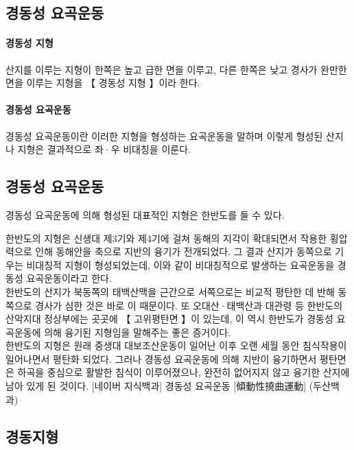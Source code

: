 \documentclass[12pt,a4paper]{book}
\begin{document}
	\subsection{경동성 요곡운동}

\paragraph{경동성 지형}
산지를 이루는 지형이 한쪽은 높고 급한 면을 이루고, 다른 한쪽은 낮고 경사가 완만한 면을 이루는 지형을 【 경동성 지형 】이라 한다. 


\paragraph{경동성 요곡운동}
경동성 요곡운동이란 이러한 지형을 형성하는 요곡운동을 말하며 이렇게 형성된 산지나 지형은 결과적으로 좌·우 비대칭을 이룬다.



	\subsection{경동성 요곡운동}


경동성 요곡운동에 의해 형성된 대표적인 지형은 한반도를 들 수 있다. 

한반도의 지형은 신생대 제3기와 제4기에 걸쳐 동해의 지각이 확대되면서 작용한 횡압력으로 인해 동해안을 축으로 지반의 융기가 전개되었다. 그 결과 산지가 동쪽으로 기우는 비대칭적 지형이 형성되었는데, 이와 같이 비대칭적으로 발생하는 요곡운동을 경동성 요곡운동이라고 한다.
\\[-1.0em]

한반도의 산지가 북동쪽의 태백산맥을 근간으로 서쪽으로는 비교적 평탄한 데 반해 동쪽으로 경사가 심한 것은 바로 이 때문이다. 또 오대산·태백산과 대관령 등 한반도의 산악지대 정상부에는 곳곳에 【 고위평탄면 】이 있는데, 이 역시 한반도가 경동성 요곡운동에 의해 융기된 지형임을 말해주는 좋은 증거이다.
\\[-1.0em]

한반도의 지형은 원래 중생대 대보조산운동이 일어난 이후 오랜 세월 동안 침식작용이 일어나면서 평탄화 되었다. 그러나 경동성 요곡운동에 의해 지반이 융기하면서 평탄면은 하곡을 중심으로 활발한 침식이 이루어졌으나, 완전히 없어지지 않고 융기한 산지에 남아 있게 된 것이다.
[네이버 지식백과] 경동성 요곡운동 [傾動性撓曲運動] (두산백과)


	\subsection{경동지형}
\end{document}

